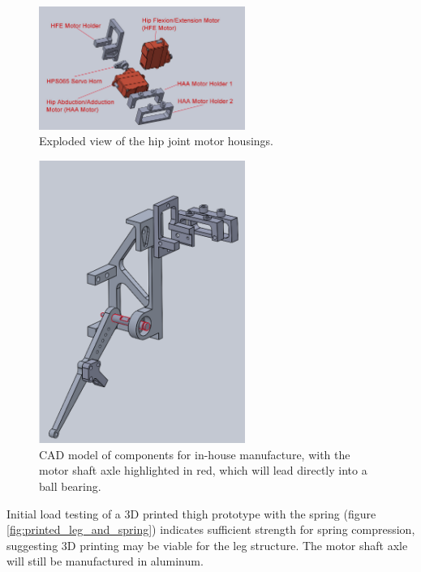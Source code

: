 \begin{figure}[h!]
    \centering
    \includegraphics[width=0.6\textwidth]{Images/exploded_motor_holder_hip.png}
    \caption{Exploded view of the hip joint motor housings.}
    \label{fig:exploded_motor_housing_hip}
\end{figure}

\begin{figure}[h!]
    \centering
    \includegraphics[width=0.6\textwidth]{Images/manufacture_only2.png}
    \caption{CAD model of components for in-house manufacture, with the motor shaft axle highlighted in red, which will lead directly into a ball bearing.}
    \label{fig:manufacture_only}
\end{figure}

Initial load testing of a 3D printed thigh prototype with the spring (figure \ref{fig:printed_leg_and_spring}) indicates sufficient strength for spring compression, suggesting 3D printing may be viable for the leg structure. The motor shaft axle will still be manufactured in aluminum.

